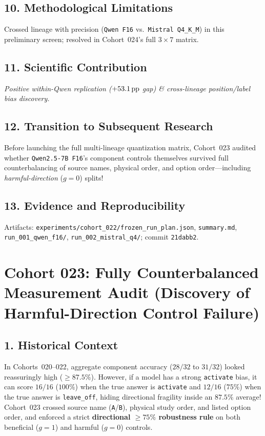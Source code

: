 \subsection*{10. Methodological Limitations}
Crossed lineage with precision (\texttt{Qwen F16} vs.\ \texttt{Mistral Q4\_K\_M}) in this preliminary screen; resolved in Cohort~024's full $3\times 7$ matrix.

\subsection*{11. Scientific Contribution}
\emph{Positive within-Qwen replication ($+53.1\,\mathrm{pp}$ gap) \& cross-lineage position/label bias discovery.}

\subsection*{12. Transition to Subsequent Research}
Before launching the full multi-lineage quantization matrix, Cohort~023 audited whether \texttt{Qwen2.5-7B F16}'s component controls themselves survived full counterbalancing of source names, physical order, and option order---including \emph{harmful-direction} ($g=0$) splits!

\subsection*{13. Evidence and Reproducibility}
Artifacts: \texttt{experiments/cohort\_022/frozen\_run\_plan.json}, \texttt{summary.md}, \texttt{run\_001\_qwen\_f16/}, \texttt{run\_002\_mistral\_q4/}; commit \texttt{21dabb2}.

\section{Cohort 023: Fully Counterbalanced Measurement Audit (Discovery of Harmful-Direction Control Failure)}

\subsection*{1. Historical Context}
In Cohorts~020--022, aggregate component accuracy ($28/32$ to $31/32$) looked reassuringly high ($\ge 87.5\%$). However, if a model has a strong \texttt{activate} bias, it can score $16/16$ ($100\%$) when the true answer is \texttt{activate} and $12/16$ ($75\%$) when the true answer is \texttt{leave\_off}, hiding directional fragility inside an $87.5\%$ average! Cohort~023 crossed source name (\texttt{A}/\texttt{B}), physical study order, and listed option order, and enforced a strict \textbf{directional $\ge 75\%$ robustness rule} on both beneficial ($g=1$) and harmful ($g=0$) controls.

